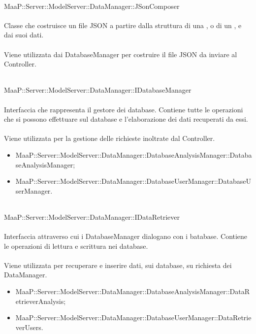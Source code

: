 \\
MaaP::Server::ModelServer::DataManager::JSonComposer\\
\\
Classe che costruisce un file JSON a partire dalla struttura di una , o di un , e dai suoi dati.\\
\\
Viene utilizzata dai DatabaseManager per costruire il file JSON da inviare al Controller.

\\
MaaP::Server::ModelServer::DataManager::IDatabaseManager\\
\\
Interfaccia che rappresenta il gestore dei database. Contiene tutte le operazioni che si possono effettuare sul database e l'elaborazione dei dati recuperati da essi.\\
\\
Viene utilizzata per la gestione delle richieste inoltrate dal Controller.\\
\begin{itemize}
\item MaaP::Server::ModelServer::DataManager::DatabaseAnalysisManager::DatabaseAnalysisManager;
\item MaaP::Server::ModelServer::DataManager::DatabaseUserManager::DatabaseUserManager.
\end{itemize}

\\
MaaP::Server::ModelServer::DataManager::IDataRetriever\\
\\
Interfaccia attraverso cui i DatabaseManager dialogano con i batabase. Contiene le operazioni di lettura e scrittura nei database.\\
\\
Viene utilizzata per recuperare e inserire dati, sui database, su richiesta dei DataManager.\\
\begin{itemize}
\item MaaP::Server::ModelServer::DataManager::DatabaseAnalysisManager::DataRetrieverAnalysis;
\item MaaP::Server::ModelServer::DataManager::DatabaseUserManager::DataRetrieverUsers.
\end{itemize}

